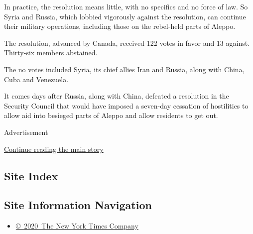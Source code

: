 In practice, the resolution means little, with no specifics and no force
of law. So Syria and Russia, which lobbied vigorously against the
resolution, can continue their military operations, including those on
the rebel-held parts of Aleppo.

The resolution, advanced by Canada, received 122 votes in favor and 13
against. Thirty-six members abstained.

The no votes included Syria, its chief allies Iran and Russia, along
with China, Cuba and Venezuela.

It comes days after Russia, along with China, defeated a resolution in
the Security Council that would have imposed a seven-day cessation of
hostilities to allow aid into besieged parts of Aleppo and allow
residents to get out.

Advertisement

\protect\hyperlink{after-bottom}{Continue reading the main story}

\hypertarget{site-index}{%
\subsection{Site Index}\label{site-index}}

\hypertarget{site-information-navigation}{%
\subsection{Site Information
Navigation}\label{site-information-navigation}}

\begin{itemize}
\tightlist
\item
  \href{https://help.nytimes3xbfgragh.onion/hc/en-us/articles/115014792127-Copyright-notice}{©~2020~The
  New York Times Company}
\end{itemize}

